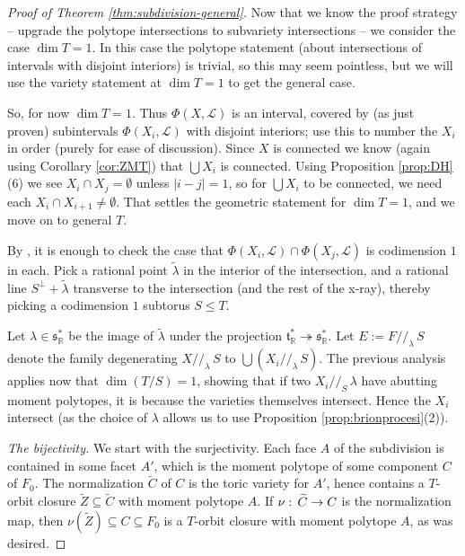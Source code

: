 \documentclass[10pt,a4paper]{amsart}
\newcommand{\RR}{\mathbb{R}}
\newcommand\Union\bigcup
\newcommand\lie[1]{{\mathfrak #1}}
\newcommand\calL{{\mathcal L}}
\newcommand\onto\twoheadrightarrow
\renewcommand{\colon}{\mathrel{:}}
\renewcommand{\colon}{:\mkern\thinmuskip}
\begin{document}
\begin{proof}[Proof of Theorem \ref{thm:subdivision-general}]
  Now that we know the proof strategy -- upgrade the polytope intersections
  to subvariety intersections -- we consider the case $\dim T = 1$.
  In this case the polytope statement (about intersections of
  intervals with disjoint interiors) is trivial, so this may seem pointless,
  but we will use the variety statement at $\dim T = 1$ to get the
  general case.

  So, for now $\dim T = 1$. Thus $\Phi(X,\calL)$ is an interval, covered by
  (as just proven) subintervals $\Phi(X_i,\calL)$ with disjoint interiors;
  use this to number the $X_i$ in order (purely for ease of discussion). 
  Since $X$ is connected we know (again using Corollary \ref{cor:ZMT}) that
  $\Union X_i$ is connected.
  Using Proposition \ref{prop:DH}(6) we see $X_i \cap X_j = \emptyset$
  unless $|i-j|=1$, so for $\Union X_i$ to be connected, we need each
  $X_i \cap X_{i+1} \neq \emptyset$. That settles the geometric
  statement for $\dim T=1$, and we move on to general $T$.
  
  By \cite{GR-facet-to-facet},
  it is enough to check the case that
  $\Phi(X_i,\calL) \cap \Phi(X_j,\calL)$ is codimension $1$ in each.
  Pick a rational point $\tilde\lambda$ in the interior of the intersection,
  and a rational line $S^\perp + \tilde\lambda$ transverse to the intersection
  (and the rest of the x-ray), thereby picking a codimension $1$ subtorus
  $S\leq T$.

  Let $\lambda \in \lie s_\RR^*$ be the image of $\tilde\lambda$
  under the projection $\lie t_\RR^* \onto \lie s_\RR^*$.
  Let $E := F//_\lambda\, S$ denote the family degenerating $X//_\lambda\, S$
  to $\Union (X_i//_\lambda\, S)$. The previous analysis applies now
  that $\dim(T/S)=1$, showing that if two $X_i//_S\,\lambda$ have
  abutting moment polytopes, it is because the varieties themselves
  intersect. Hence the $X_i$ intersect (as the choice of $\lambda$
  allows us to use Proposition \ref{prop:brionprocesi}(2)).

  {\em The bijectivity.} We start with the surjectivity. Each face $A$ of the
  subdivision is contained in some facet $A'$, which is the moment
  polytope of some component $C$ of $F_0$. The normalization $\widetilde C$
  of $C$ is the toric variety for $A'$, hence contains a $T$-orbit
  closure $\widetilde Z \subseteq \widetilde C$ with moment polytope $A$.
  If $\nu\colon \widetilde C \to C$ is the normalization map,
  then $\nu(\widetilde Z) \subseteq C \subseteq F_0$ is a $T$-orbit closure
  with moment polytope $A$, as was desired.


\end{proof}
\end{document}
